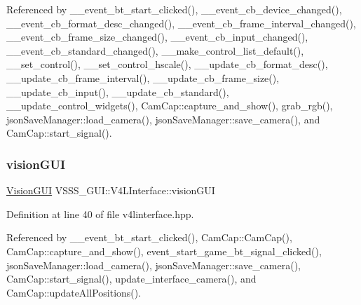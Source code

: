 Referenced by \+\_\+\+\_\+event\+\_\+bt\+\_\+start\+\_\+clicked(), \+\_\+\+\_\+event\+\_\+cb\+\_\+device\+\_\+changed(), \+\_\+\+\_\+event\+\_\+cb\+\_\+format\+\_\+desc\+\_\+changed(), \+\_\+\+\_\+event\+\_\+cb\+\_\+frame\+\_\+interval\+\_\+changed(), \+\_\+\+\_\+event\+\_\+cb\+\_\+frame\+\_\+size\+\_\+changed(), \+\_\+\+\_\+event\+\_\+cb\+\_\+input\+\_\+changed(), \+\_\+\+\_\+event\+\_\+cb\+\_\+standard\+\_\+changed(), \+\_\+\+\_\+make\+\_\+control\+\_\+list\+\_\+default(), \+\_\+\+\_\+set\+\_\+control(), \+\_\+\+\_\+set\+\_\+control\+\_\+hscale(), \+\_\+\+\_\+update\+\_\+cb\+\_\+format\+\_\+desc(), \+\_\+\+\_\+update\+\_\+cb\+\_\+frame\+\_\+interval(), \+\_\+\+\_\+update\+\_\+cb\+\_\+frame\+\_\+size(), \+\_\+\+\_\+update\+\_\+cb\+\_\+input(), \+\_\+\+\_\+update\+\_\+cb\+\_\+standard(), \+\_\+\+\_\+update\+\_\+control\+\_\+widgets(), Cam\+Cap\+::capture\+\_\+and\+\_\+show(), grab\+\_\+rgb(), json\+Save\+Manager\+::load\+\_\+camera(), json\+Save\+Manager\+::save\+\_\+camera(), and Cam\+Cap\+::start\+\_\+signal().

\mbox{\label{class_v_s_s_s___g_u_i_1_1_v4_l_interface_a7a2432ad62a960423bc3370abe5c8930}} 
\subsubsection{\texorpdfstring{vision\+G\+UI}{visionGUI}}
{\footnotesize\ttfamily \hyperlink{class_vision_g_u_i}{Vision\+G\+UI} V\+S\+S\+S\+\_\+\+G\+U\+I\+::\+V4\+L\+Interface\+::vision\+G\+UI}



Definition at line 40 of file v4linterface.\+hpp.



Referenced by \+\_\+\+\_\+event\+\_\+bt\+\_\+start\+\_\+clicked(), Cam\+Cap\+::\+Cam\+Cap(), Cam\+Cap\+::capture\+\_\+and\+\_\+show(), event\+\_\+start\+\_\+game\+\_\+bt\+\_\+signal\+\_\+clicked(), json\+Save\+Manager\+::load\+\_\+camera(), json\+Save\+Manager\+::save\+\_\+camera(), Cam\+Cap\+::start\+\_\+signal(), update\+\_\+interface\+\_\+camera(), and Cam\+Cap\+::update\+All\+Positions().

\mbox{\label{class_v_s_s_s___g_u_i_1_1_v4_l_interface_ac87d2ec65167aae1177178f6bffce0ed}} 
